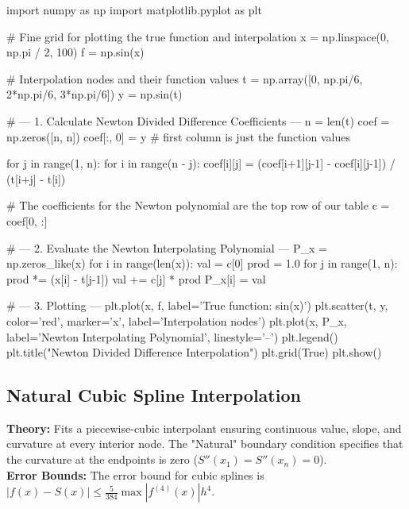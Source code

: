 \documentclass{article}
\begin{document}
\begin{jupytercode}
import numpy as np
import matplotlib.pyplot as plt

# Fine grid for plotting the true function and interpolation
x = np.linspace(0, np.pi / 2, 100)
f = np.sin(x)

# Interpolation nodes and their function values
t = np.array([0, np.pi/6, 2*np.pi/6, 3*np.pi/6])
y = np.sin(t)

# --- 1. Calculate Newton Divided Difference Coefficients ---
n = len(t)
coef = np.zeros([n, n])
coef[:, 0] = y # first column is just the function values

for j in range(1, n):
    for i in range(n - j):
        coef[i][j] = (coef[i+1][j-1] - coef[i][j-1]) / (t[i+j] - t[i])

# The coefficients for the Newton polynomial are the top row of our table
c = coef[0, :]

# --- 2. Evaluate the Newton Interpolating Polynomial ---
P_x = np.zeros_like(x)
for i in range(len(x)):
    val = c[0]
    prod = 1.0
    for j in range(1, n):
        prod *= (x[i] - t[j-1])
        val += c[j] * prod
    P_x[i] = val

# --- 3. Plotting ---
plt.plot(x, f, label='True function: sin(x)')
plt.scatter(t, y, color='red', marker='x', label='Interpolation nodes')
plt.plot(x, P_x, label='Newton Interpolating Polynomial', linestyle='--')
plt.legend()
plt.title("Newton Divided Difference Interpolation")
plt.grid(True)
plt.show()
\end{jupytercode}
\newpage

\subsection{Natural Cubic Spline Interpolation}
\textbf{Theory:} Fits a piecewise-cubic interpolant ensuring continuous value, slope, and curvature at every interior node. The "Natural" boundary condition specifies that the curvature at the endpoints is zero ($S''(x_1) = S''(x_n) = 0$). \\
\textbf{Error Bounds:} The error bound for cubic splines is $|f(x) - S(x)| \le \frac{5}{384} \max |f^{(4)}(x)| h^4$.
\end{document}
